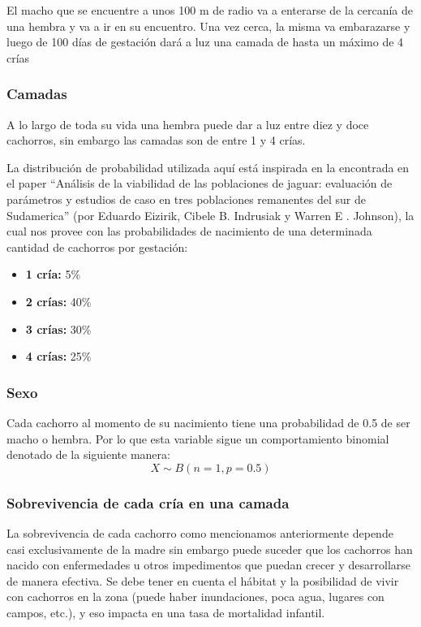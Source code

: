             El macho que se encuentre a unos 100 m de radio va a enterarse de la cercanía de una hembra y va a ir en su encuentro. Una vez cerca, la misma va embarazarse y luego de 100 días de gestación dará a luz una camada de hasta un máximo de 4 crías
        
        \subsubsection{Camadas}
            A lo largo de toda su vida una hembra puede dar a luz entre diez y doce cachorros, sin embargo las camadas son de entre 1 y 4 crías.
            
            La distribución de probabilidad utilizada aquí está inspirada en la encontrada en el paper “Análisis de la viabilidad de las poblaciones de jaguar: evaluación de parámetros y estudios de caso en tres poblaciones remanentes del sur de Sudamerica” (por Eduardo Eizirik, Cibele B. Indrusiak y Warren E . Johnson), la cual nos provee con las probabilidades de nacimiento de una determinada cantidad de cachorros por gestación:

            \begin{itemize}
                \item \textbf{1 cría:} 5\%
                \item \textbf{2 crías:} 40\%
                \item \textbf{3 crías:} 30\%
                \item \textbf{4 crías:} 25\%
            \end{itemize}
        \subsubsection{Sexo}
            Cada cachorro al momento de su nacimiento tiene una probabilidad de 0.5 de ser macho o hembra. Por lo que esta variable sigue un comportamiento binomial denotado de la siguiente manera:
            \begin{equation}
                X \sim B(n=1, p=0.5)
            \end{equation}
        \subsubsection{Sobrevivencia de cada cría en una camada}
            La sobrevivencia de cada cachorro como mencionamos anteriormente depende casi exclusivamente de la madre sin embargo puede suceder que los cachorros han nacido con enfermedades u otros impedimentos que puedan crecer y desarrollarse de manera efectiva. Se debe tener en cuenta el hábitat y la posibilidad de vivir con cachorros en la zona (puede haber inundaciones, poca agua, lugares con campos, etc.), y eso impacta en una tasa de mortalidad infantil.
            
